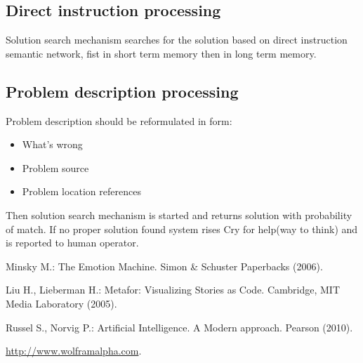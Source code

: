 \documentclass{acm_proc_article-sp}
\begin{document}
\subsection{Direct instruction processing}

Solution search mechanism searches for the solution based on direct instruction semantic network, fist in short term memory then in long term memory.

\subsection{Problem description processing}

Problem description should be reformulated in form:
\begin{itemize}
  \item What's wrong
  \item Problem source
  \item Problem location references
\end{itemize}

Then solution search mechanism is started and returns solution with probability of match. If no proper solution found system rises Cry for help(way to think) and is reported to human operator.

\begin{thebibliography}{4}

Minsky M.:
The Emotion Machine.
Simon \& Schuster Paperbacks  (2006).

Liu H., Lieberman H.:
Metafor: Visualizing Stories as Code.
Cambridge, MIT Media Laboratory  (2005).

Russel S., Norvig P.:
Artificial Intelligence. A Modern approach.
Pearson (2010).

\href{http://www.wolframalpha.com}{http://www.wolframalpha.com}.

\end{thebibliography}
\end{document}

